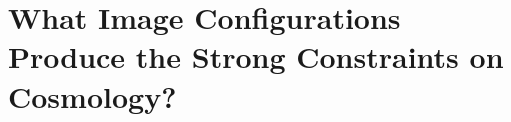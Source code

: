 \section{What Image Configurations Produce the Strong Constraints on Cosmology?}
\label{sec:ImageConfigs}